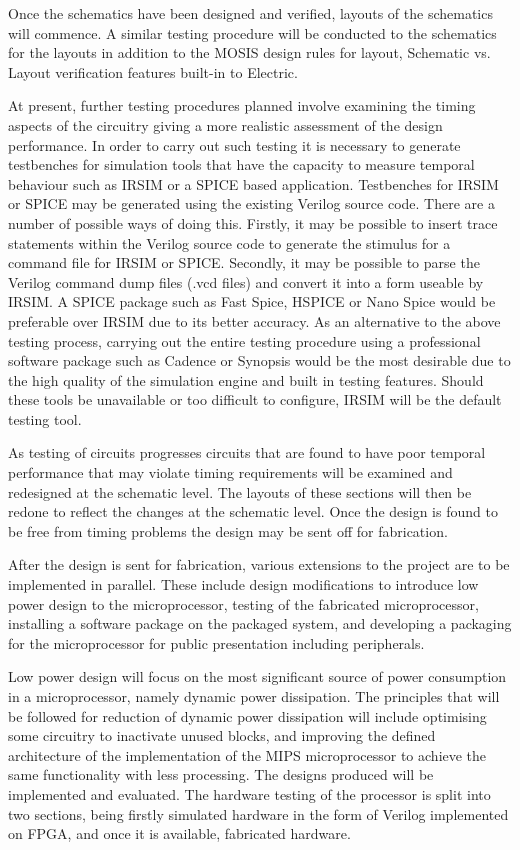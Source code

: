 Once the schematics have been designed and verified, layouts of the schematics will commence. A similar testing procedure will be conducted to the schematics for the layouts in addition to the MOSIS design rules for layout, Schematic vs. Layout verification features built-in to Electric.

At present, further testing procedures planned involve examining the timing aspects of the circuitry giving a more realistic assessment of the design performance. In order to carry out such testing it is necessary to generate testbenches for simulation tools that have the capacity to measure temporal behaviour such as IRSIM or a SPICE based application. Testbenches for IRSIM or SPICE may be generated using the existing Verilog source code. There are a number of possible ways of doing this. Firstly, it may be possible to insert trace statements within the Verilog source code to generate the stimulus for a command file for IRSIM or SPICE. Secondly, it may be possible to parse the Verilog command dump files (.vcd files) and convert it into a form useable by IRSIM. A SPICE package such as Fast Spice, HSPICE or Nano Spice would be preferable over IRSIM due to its better accuracy. As an alternative to the above testing process, carrying out the entire testing procedure using a professional software package such as Cadence or Synopsis would be the most desirable due to the high quality of the simulation engine and built in testing features. Should these tools be unavailable or too difficult to configure, IRSIM will be the default testing tool.

As testing of circuits progresses circuits that are found to have poor temporal performance that may violate timing requirements will be examined and redesigned at the schematic level. The layouts of these sections will then be redone to reflect the changes at the schematic level. Once the design is found to be free from timing problems the design may be sent off for fabrication.

After the design is sent for fabrication, various extensions to the project are to be implemented in parallel. These include design modifications to introduce low power design to the microprocessor, testing of the fabricated microprocessor, installing a software package on the packaged system, and developing a packaging for the microprocessor for public presentation including peripherals.

Low power design will focus on the most significant source of power consumption in a microprocessor, namely dynamic power dissipation. The principles that will be followed for reduction of dynamic power dissipation will include optimising some circuitry to inactivate unused blocks, and improving the defined architecture of the implementation of the MIPS microprocessor to achieve the same functionality with less processing. The designs produced will be implemented and evaluated.
The hardware testing of the processor is split into two sections, being firstly simulated hardware in the form of Verilog implemented on FPGA, and once it is available, fabricated hardware.

